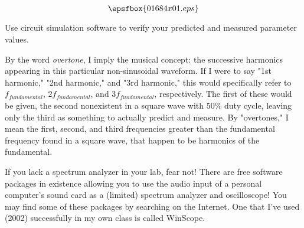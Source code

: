 

$$\epsfbox{01684x01.eps}$$

\vfil \eject






Use circuit simulation software to verify your predicted and measured parameter values.







By the word {\it overtone}, I imply the musical concept: the successive harmonics appearing in this particular non-sinusoidal waveform.  If I were to say "1st harmonic," "2nd harmonic," and "3rd harmonic," this would specifically refer to $f_{fundamental}$, $2f_{fundamental}$, and $3f_{fundamental}$, respectively.  The first of these would be given, the second nonexistent in a square wave with 50\% duty cycle, leaving only the third as something to actually predict and measure.  By "overtones," I mean the first, second, and third frequencies greater than the fundamental frequency found in a square wave, that happen to be harmonics of the fundamental.

If you lack a spectrum analyzer in your lab, fear not!  There are free software packages in existence allowing you to use the audio input of a personal computer's sound card as a (limited) spectrum analyzer and oscilloscope!  You may find some of these packages by searching on the Internet.  One that I've used (2002) successfully in my own class is called WinScope.




